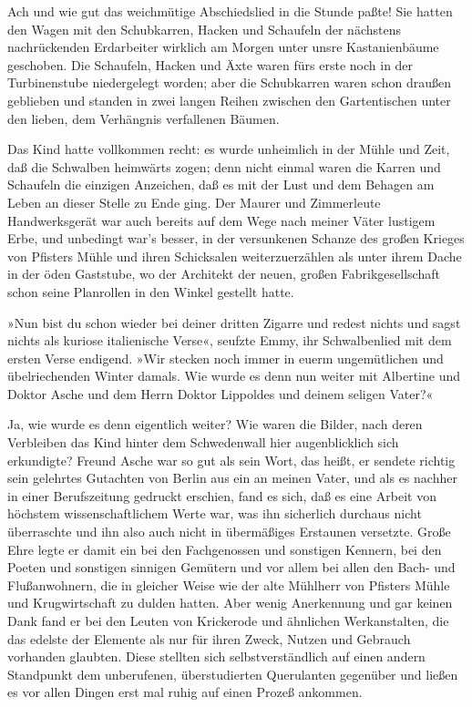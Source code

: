Ach und wie gut das weichmütige Abschiedslied in die Stunde paßte!
Sie hatten den Wagen mit den Schubkarren, Hacken und Schaufeln der
nächstens nachrückenden Erdarbeiter wirklich am Morgen unter unsre
Kastanienbäume geschoben. Die Schaufeln, Hacken und Äxte waren fürs
erste noch in der Turbinenstube niedergelegt worden; aber die
Schubkarren waren schon draußen geblieben und standen in zwei
langen Reihen zwischen den Gartentischen unter den lieben, dem
Verhängnis verfallenen Bäumen.

Das Kind hatte vollkommen recht: es wurde unheimlich in der Mühle
und Zeit, daß die Schwalben heimwärts zogen; denn nicht einmal
waren die Karren und Schaufeln die einzigen Anzeichen, daß es mit
der Lust und dem Behagen am Leben an dieser Stelle zu Ende ging.
Der Maurer und Zimmerleute Handwerksgerät war auch bereits auf dem
Wege nach meiner Väter lustigem Erbe, und unbedingt war's besser,
in der versunkenen Schanze des großen Krieges von Pfisters Mühle
und ihren Schicksalen weiterzuerzählen als unter ihrem Dache in der
öden Gaststube, wo der Architekt der neuen, großen
Fabrikgesellschaft schon seine Planrollen in den Winkel gestellt
hatte.

»Nun bist du schon wieder bei deiner dritten Zigarre und redest
nichts und sagst nichts als kuriose italienische Verse«, seufzte
Emmy, ihr Schwalbenlied mit dem ersten Verse endigend. »Wir stecken
noch immer in euerm ungemütlichen und übelriechenden Winter damals.
Wie wurde es denn nun weiter mit Albertine und Doktor Asche und dem
Herrn Doktor Lippoldes und deinem seligen Vater?«

Ja, wie wurde es denn eigentlich weiter? Wie waren die Bilder, nach
deren Verbleiben das Kind hinter dem Schwedenwall hier
augenblicklich sich erkundigte? Freund Asche war so gut als sein
Wort, das heißt, er sendete richtig sein gelehrtes Gutachten von
Berlin aus ein an meinen Vater, und als es nachher in einer
Berufszeitung gedruckt erschien, fand es sich, daß es eine Arbeit
von höchstem wissenschaftlichem Werte war, was ihn sicherlich
durchaus nicht überraschte und ihn also auch nicht in übermäßiges
Erstaunen versetzte. Große Ehre legte er damit ein bei den
Fachgenossen und sonstigen Kennern, bei den Poeten und sonstigen
sinnigen Gemütern und vor allem bei allen den Bach- und
Flußanwohnern, die in gleicher Weise wie der alte Mühlherr von
Pfisters Mühle und Krugwirtschaft zu dulden hatten. Aber wenig
Anerkennung und gar keinen Dank fand er bei den Leuten von
Krickerode und ähnlichen Werkanstalten, die das edelste der
Elemente als nur für ihren Zweck, Nutzen und Gebrauch vorhanden
glaubten. Diese stellten sich selbstverständlich auf einen andern
Standpunkt dem unberufenen, überstudierten Querulanten gegenüber
und ließen es vor allen Dingen erst mal ruhig auf einen Prozeß
ankommen.

